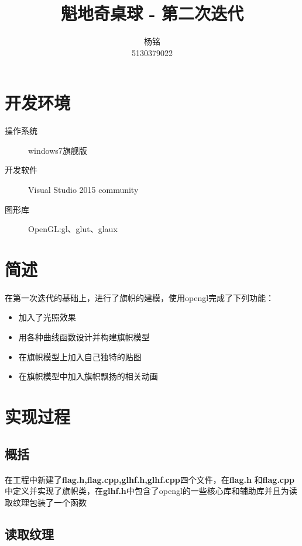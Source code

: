 \documentclass{article}
\author{杨铭\\5130379022}
\title{魁地奇桌球 - 第二次迭代}
\begin{document}
    \maketitle
    \section{开发环境}
        \begin{description}
          \item[操作系统] windows7旗舰版
          \item[开发软件] Visual Studio 2015 community
          \item[图形库] OpenGL:gl、glut、glaux
        \end{description}
    \section{简述}
        \paragraph{}
        在第一次迭代的基础上，进行了旗帜的建模，使用opengl完成了下列功能：
        \begin{itemize}
          \item 加入了光照效果
          \item 用各种曲线函数设计并构建旗帜模型
          \item 在旗帜模型上加入自己独特的贴图
          \item 在旗帜模型中加入旗帜飘扬的相关动画
        \end{itemize}
    \section{实现过程}
        \subsection{概括}
        \paragraph{}
        在工程中新建了\textbf{flag.h,flag.cpp,glhf.h,glhf.cpp}四个文件，在\textbf{flag.h} 和\textbf{flag.cpp}中定义并实现了旗帜类，在\textbf{glhf.h}中包含了opengl的一些核心库和辅助库并且为读取纹理包装了一个函数
        \subsection{读取纹理}
\end{document}
